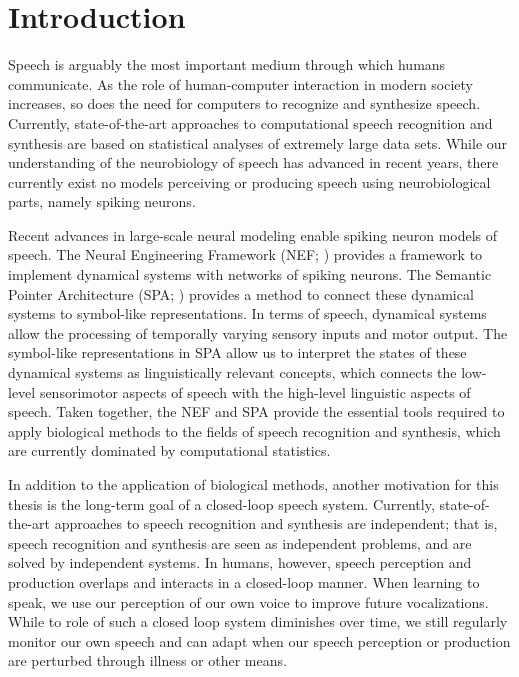 \chapter{Introduction}

Speech is arguably the most important
medium through which humans communicate.
As the role of human-computer interaction
in modern society increases,
so does the need for computers
to recognize and synthesize speech.
Currently, state-of-the-art approaches
to computational
speech recognition and synthesis
are based on statistical analyses
of extremely large data sets.
While our understanding
of the neurobiology of speech has advanced
in recent years,
there currently exist no
models perceiving or producing speech
using neurobiological parts,
namely spiking neurons.

Recent advances in large-scale neural modeling
enable spiking neuron models of speech.
The Neural Engineering Framework (NEF; \cite{eliasmith2004})
provides a framework to implement
dynamical systems with networks of spiking neurons.
The Semantic Pointer Architecture (SPA; \cite{eliasmith2013})
provides a method to connect these dynamical systems
to symbol-like representations.
In terms of speech,
dynamical systems allow
the processing of
temporally varying sensory inputs and motor output.
The symbol-like representations in SPA
allow us to interpret the states
of these dynamical systems
as linguistically relevant concepts,
which connects the low-level
sensorimotor aspects of speech
with the high-level linguistic aspects of speech.
Taken together, the NEF and SPA
provide the essential tools required
to apply biological methods
to the fields of
speech recognition and synthesis,
which are currently dominated
by computational statistics.

In addition to the application of biological methods,
another motivation for this thesis
is the long-term goal of a closed-loop
speech system.
Currently, state-of-the-art approaches
to speech recognition and synthesis
are independent;
that is, speech recognition and synthesis
are seen as independent problems,
and are solved by independent systems.
In humans, however,
speech perception and production
overlaps and interacts in a closed-loop manner.
When learning to speak,
we use our perception of our own voice
to improve future vocalizations.
While to role of such a closed loop system
diminishes over time,
we still regularly monitor
our own speech and can adapt
when our speech perception or production
are perturbed through illness
or other means.


